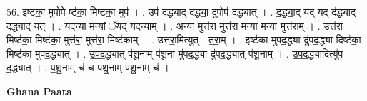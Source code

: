 \documentclass[17pt]{extarticle}
\begin{document}
56. इष्ट॑का॒ मुपोपे ष्ट॑का॒ मिष्ट॑का॒ मुप॑ । . उप॑ दद्ध्याद् दद्ध्या॒ दुपोप॑ दद्ध्यात् । . द॒द्ध्या॒द् यद् यद् द॑द्ध्याद् दद्ध्या॒द् यत् । . यद॒न्या म॒न्यां ॅयद् यद॒न्याम् । . अ॒न्या मुत्त॑रा॒ मुत्त॑रा म॒न्या म॒न्या मुत्त॑राम् । . उत्त॑रा॒ मिष्ट॑का॒ मिष्ट॑का॒ मुत्त॑रा॒ मुत्त॑रा॒ मिष्ट॑काम् । . उत्त॑रा॒मित्युत् - त॒रा॒म् । . इष्ट॑का मुपद॒द्ध्या दु॑पद॒द्ध्या दिष्ट॑का॒ मिष्ट॑का मुपद॒द्ध्यात् । . उ॒प॒द॒द्ध्यात् प॑शू॒नाम् प॑शू॒ना मु॑पद॒द्ध्या दु॑पद॒द्ध्यात् प॑शू॒नाम् । . उ॒प॒द॒द्ध्यादित्यु॑प - द॒द्ध्यात् । . प॒शू॒नाम् च॑ च पशू॒नाम् प॑शू॒नाम् च॑ । \newline

\textbf{Ghana Paata } \newline
\end{document}
